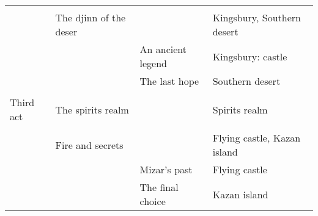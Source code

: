 \begin{table}[H]
\begin{tabular}{|llll|}
\multicolumn{1}{|l|}{}                                           &                                                             &                                                                &                             \\ \cline{2-4} 
\multicolumn{1}{|l|}{}                                           & \multicolumn{1}{l|}{The djinn of the deser}                 & \multicolumn{1}{l|}{}                                          & Kingsbury, Southern desert  \\ \cline{2-4} 
\multicolumn{1}{|l|}{}                                           & \multicolumn{1}{l|}{}                                       & \multicolumn{1}{l|}{An ancient legend}                         & Kingsbury:  castle          \\ \cline{2-4} 
\multicolumn{1}{|l|}{}                                           & \multicolumn{1}{l|}{}                                       & \multicolumn{1}{l|}{The last hope}                             & Southern desert             \\ \hline
                                                                 &                                                             &                                                                &                             \\ \hline
\multicolumn{1}{|l|}{\cellcolor[HTML]{C0C0C0}Third act}          & \multicolumn{1}{l|}{The spirits realm}                      & \multicolumn{1}{l|}{}                                          & Spirits realm               \\ \hline
\multicolumn{1}{|l|}{}                                           &                                                             &                                                                &                             \\ \cline{2-4} 
\multicolumn{1}{|l|}{}                                           & \multicolumn{1}{l|}{Fire and secrets}                       & \multicolumn{1}{l|}{}                                          & Flying castle, Kazan island \\ \hline
\multicolumn{1}{|l|}{}                                           & \multicolumn{1}{l|}{}                                       & \multicolumn{1}{l|}{Mizar’s past}                              & Flying castle               \\ \hline
\multicolumn{1}{|l|}{}                                           & \multicolumn{1}{l|}{}                                       & \multicolumn{1}{l|}{The final choice}                          & Kazan island                \\ \hline
\end{tabular}
\end{table}
